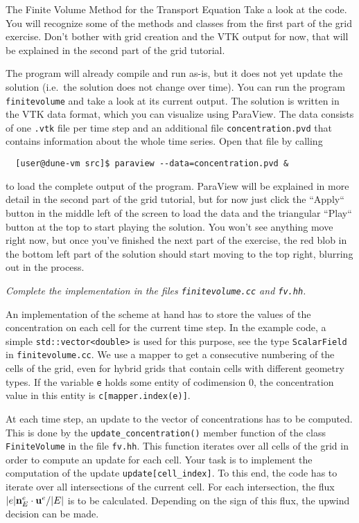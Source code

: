 \documentclass[12pt,a4paper]{article}
\newcommand{\uu}{\textbf u}
\newcommand{\nn}{\textbf n}
\begin{document}
\begin{Exercise}{The Finite Volume Method for the Transport Equation}
  Take a look at the code. You will recognize some of the methods and classes
  from the first part of the grid exercise. Don't bother with grid creation and
  the VTK output for now, that will be explained in the second part of the grid
  tutorial.

  The program will already compile and run as-is, but it does not yet update
  the solution (i.e.~the solution does not change over time). You can run the
  program \lstinline!finitevolume! and take a look at its current output. The
  solution is written in the VTK data format, which you can visualize using
  ParaView. The data consists of one \lstinline!.vtk! file per time step and
  an additional file \lstinline!concentration.pvd! that contains information
  about the whole time series. Open that file by calling
\begin{lstlisting}
  [user@dune-vm src]$ paraview --data=concentration.pvd &
\end{lstlisting}
  to load the complete output of the program. ParaView will be explained in more
  detail in the second part of the grid tutorial, but for now just click the
  ``Apply`` button in the middle left of the screen to load the data and the
  triangular ``Play`` button at the top to start playing the solution. You won't
  see anything move right now, but once you've finished the next part of the
  exercise, the red blob in the bottom left part of the solution should start
  moving to the top right, blurring out in the process.

 \emph{Complete the implementation in the files \texttt{finitevolume.cc} and \texttt{fv.hh}.}

  An implementation of the scheme at hand has to store the values of
  the concentration on each cell for the current time step.  In the
  example code, a simple \texttt{std::vector<double>} is used for this
  purpose, see the type \texttt{ScalarField} in
  \texttt{finitevolume.cc}.  We use a mapper to get a consecutive
  numbering of the cells of the grid, even for hybrid grids that contain
  cells with different geometry types.  If the variable \texttt{e}
  holds some entity of codimension 0, the concentration value in this
  entity is \texttt{c[mapper.index(e)]}.

  At each time step, an update to the vector of concentrations has to
  be computed.  This is done by the \texttt{update\_concentration()} member function
  of the class \texttt{FiniteVolume} in the file \texttt{fv.hh}.  This
  function iterates over all cells of the grid in order to compute an
  update for each cell.  Your task is to implement the computation of
  the update \texttt{update[cell\_index]}.  To this end, the code has to
  iterate over all intersections of the current cell.  For each
  intersection, the flux $|e|\nn_E^e\cdot\uu^e/|E|$ is to be
  calculated.  Depending on the sign of this flux, the upwind decision
  can be made.


\end{Exercise}
\end{document}
